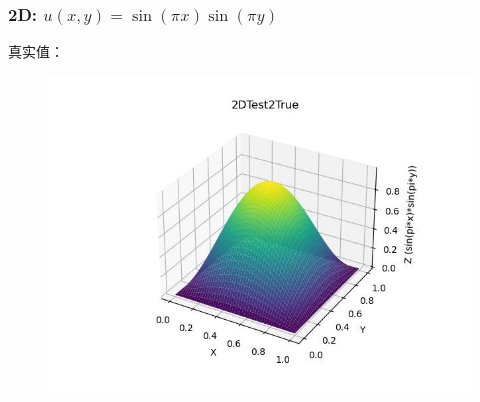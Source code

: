 \documentclass{article}
\begin{document}
\subsubsection{2D: $u(x,y)=\sin(\pi x)\sin(\pi y)$}
真实值：
\begin{figure}[h]
    \centering
    \includegraphics[width=0.7\linewidth]{2DTest2True.jpg}
\end{figure}
\newpage
\end{document}
